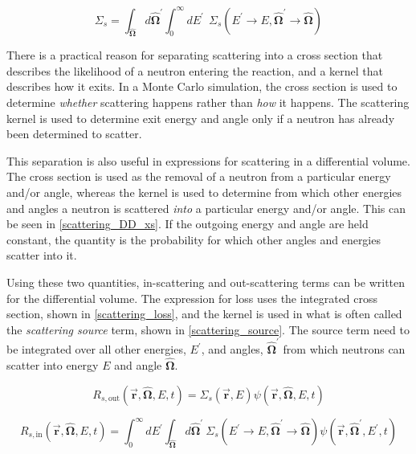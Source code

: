 \begin{equation}
\label{scattering_DD_xs}
\Sigma_s = \int_{\boldsymbol{\hat{\Omega}}} d\boldsymbol{\hat{\Omega}}^\prime \int_0^\infty dE^\prime \: \: \Sigma_s(E^\prime \rightarrow E,\boldsymbol{\hat{\Omega}}^\prime \rightarrow \boldsymbol{\hat{\Omega}})
 \end{equation}

There is a practical reason for separating scattering into a cross
 section that describes the likelihood of a neutron entering the reaction, and a kernel that describes how it exits.  In a Monte Carlo simulation, the cross section is used to determine \emph{whether} scattering happens rather than \emph{how} it happens.  The scattering kernel is used to determine exit energy and angle only if a neutron has already been determined to scatter.  
 
This separation is also useful in expressions for scattering in a differential volume.  The cross section is used as the removal of a neutron from a particular energy and/or angle, whereas the kernel is used to determine from which other energies and angles a neutron is scattered \emph{into} a particular energy and/or angle.  This can be seen in \eqref{scattering_DD_xs}.  If the outgoing energy and angle are held constant, the quantity is the probability for which other angles and energies scatter into it.

Using these two quantities, in-scattering and out-scattering terms can be written for the differential volume.  The expression for loss uses the integrated cross section, shown in \eqref{scattering_loss}, and the kernel is used in what is often called the \emph{scattering source} term, shown in \eqref{scattering_source}.  The source term need to be integrated over all other energies, $E^\prime$, and angles, $\boldsymbol{\hat{\Omega}}^\prime$ from which neutrons can scatter into energy $E$ and angle $\boldsymbol{\hat{\Omega}}$.

\begin{equation}
\label{scattering_loss}
R_{s, \mathrm{out}}( \boldsymbol{\vec{r}},\boldsymbol{\hat{\Omega}},E,t ) = \Sigma_s (\boldsymbol{\vec{r}},E) \psi(\boldsymbol{\vec{r}},\boldsymbol{\hat{\Omega}},E,t)
 \end{equation}
 
 \begin{equation}
\label{scattering_source}
R_{s, \mathrm{in}}(\boldsymbol{\vec{r}},\boldsymbol{\hat{\Omega}},E,t) = \int_0^\infty dE^\prime \int_{\boldsymbol{\hat{\Omega}}} d\boldsymbol{\hat{\Omega}}^\prime \: \Sigma_s(E^\prime \rightarrow E,\boldsymbol{\hat{\Omega}}^\prime \rightarrow \boldsymbol{\hat{\Omega}}) \psi(\boldsymbol{\vec{r}},\boldsymbol{\hat{\Omega}}^\prime,E^\prime,t)  
 \end{equation}
 
